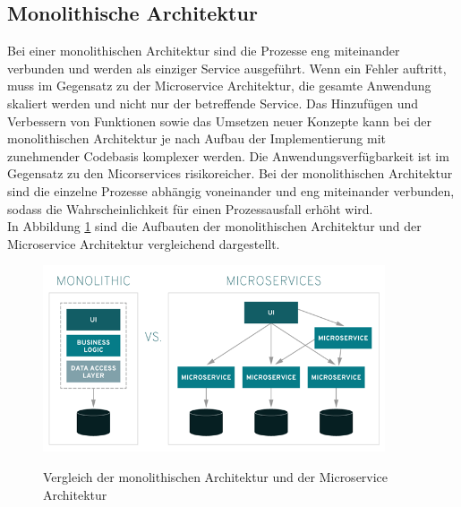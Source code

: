 \subsection{Monolithische Architektur}
Bei einer monolithischen Architektur sind die Prozesse eng miteinander verbunden und werden als einziger Service ausgeführt. Wenn ein Fehler auftritt, muss im Gegensatz zu der Microservice Architektur, die gesamte Anwendung skaliert werden und nicht nur der betreffende Service. Das Hinzufügen und Verbessern von Funktionen sowie das Umsetzen neuer Konzepte kann bei der monolithischen Architektur je nach Aufbau der Implementierung mit zunehmender Codebasis komplexer werden. Die Anwendungsverfügbarkeit ist im Gegensatz zu den Micorservices risikoreicher. Bei der monolithischen Architektur sind die einzelne Prozesse abhängig voneinander und eng miteinander verbunden, sodass die Wahrscheinlichkeit für einen Prozessausfall erhöht wird.\\
In Abbildung \ref{mono} sind die Aufbauten der monolithischen Architektur und der Microservice Architektur vergleichend dargestellt.
\begin{figure}[bth] 
	\centering
	\includegraphics[width=0.9\textwidth]{Graphics/monoVsMicro.png}
	\caption{Vergleich der monolithischen Architektur und der Microservice Architektur}
	\label{mono}
	\cite{microBild}
\end{figure}\\
